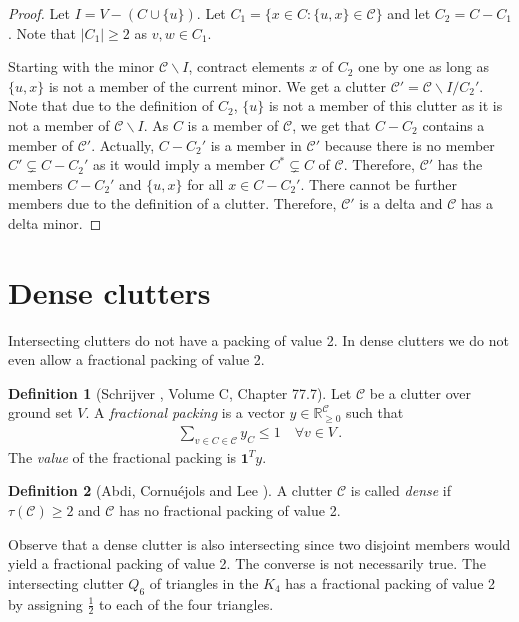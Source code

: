 \documentclass[a4paper, 12pt]{scrbook}
\theoremstyle{definition}
\newtheorem*{definition}{Definition}
\newcommand*{\IR}{\ensuremath{\mathbb{R}}}
\begin{document}
\begin{proof}
    Let $I=V-(C \cup \{u\})$. Let $C_1 = \{x \in C: \{u,x\} \in \mathcal{C}\}$ and let $C_2=C-C_1$. Note that $|C_1|\geq 2$ as $v,w \in C_1$.

    Starting with the minor $\mathcal{C} \backslash I$, contract elements $x$ of $C_2$ one by one as long as $\{u,x\}$ is not a member of the current minor.
    We get a clutter $\mathcal{C'}=\mathcal{C} \backslash I/C_2'$.
    Note that due to the definition of $C_2$, $\{u\}$ is not a member of this clutter as it is not a member of $\mathcal{C} \backslash I$.
    As $C$ is a member of $\mathcal{C}$, we get that $C-C_2$ contains a member of $\mathcal{C'}$.
    Actually, $C-C_2'$ is a member in $\mathcal{C'}$ because there is no member $C' \subsetneq C-C_2'$ as it would imply a member $C^* \subsetneq C$ of $\mathcal{C}$.
    Therefore, $\mathcal{C'}$ has the members $C-C_2'$ and $\{u,x\}$ for all $x \in C-C_2'$. There cannot be further members due to the definition of a clutter. Therefore, $\mathcal{C'}$ is a delta and $\mathcal{C}$ has a delta minor.
\end{proof}


\section{Dense clutters}
Intersecting clutters do not have a packing of value 2. In dense clutters we do not even allow a fractional packing of value 2.
\begin{definition}[Schrijver \cite{combopt}, Volume C, Chapter 77.7]
    Let $\mathcal{C}$ be a clutter over ground set $V$.
    A \emph{fractional packing} is a vector $y \in \IR_{\geq0}^{\mathcal{C}}$ such that
    \begin{align*}
        \sum_{v \in C \in \mathcal{C}} y_C \leq 1 \quad \forall v \in V \,.
    \end{align*}
    The \emph{value} of the fractional packing is $\textbf{1}^Ty$.
\end{definition}

\begin{definition}[Abdi, Cornuéjols and Lee \cite{restrictions}]
    A clutter $\mathcal{C}$ is called \emph{dense} if $\tau(\mathcal{C}) \geq 2$ and $\mathcal{C}$ has no fractional packing of value 2.
\end{definition}

Observe that a dense clutter is also intersecting since two disjoint members would yield a fractional packing of value 2.
The converse is not necessarily true.
The intersecting clutter $Q_6$ of triangles in the $K_4$ has a fractional packing of value 2 by assigning $\frac 12$ to each of the four triangles.
\end{document}
